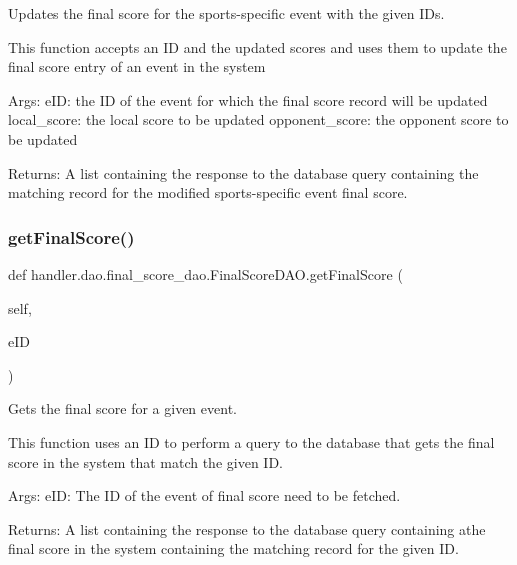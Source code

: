 \begin{DoxyVerb}Updates the final score for the sports-specific event with the given IDs.

This function accepts an ID and the updated scores and uses them to update
the final score entry of an event in the system

Args:
    eID: the ID of the event for which the final score record will be updated
    local_score: the local score to be updated
    opponent_score: the opponent score to be updated
   
    
Returns:
    A list containing the response to the database query
    containing the matching record for the modified sports-specific
    event final score.
\end{DoxyVerb}
 \mbox{\label{classhandler_1_1dao_1_1final__score__dao_1_1_final_score_d_a_o_a8694f4c5772c0c15fd5d50a91a4103dd}} 
\subsubsection{\texorpdfstring{get\+Final\+Score()}{getFinalScore()}}
{\footnotesize\ttfamily def handler.\+dao.\+final\+\_\+score\+\_\+dao.\+Final\+Score\+D\+A\+O.\+get\+Final\+Score (\begin{DoxyParamCaption}\item[{}]{self,  }\item[{}]{e\+ID }\end{DoxyParamCaption})}

\begin{DoxyVerb}Gets the final score for a given event. 

This function uses an ID to perform a query to the database
that gets the final score in the system that match the given ID.

Args:
    eID: The ID of the event of final score need to be fetched.
    
Returns:
    A list containing the response to the database query
    containing athe final score in the system containing 
    the matching record for the given ID.
\end{DoxyVerb}
 \mbox{\label{classhandler_1_1dao_1_1final__score__dao_1_1_final_score_d_a_o_a5236be2fb1a7a2d4a0ace18bf06f6fdd}} 
